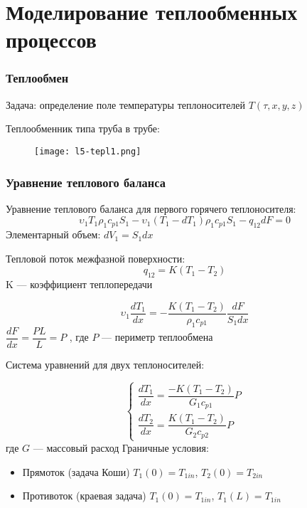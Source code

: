 \section{Моделирование теплообменных процессов}

\begin{frame}
	\frametitle{Теплообмен}
	Задача: определение поле температуры теплоносителей $T(\tau, x, y, z)$
	
	Теплообменник типа труба в трубе:
	\begin{figure}[h]
		\texttt{[image: l5-tepl1.png]}
	\end{figure}
\end{frame}

\begin{frame}
\frametitle{Уравнение теплового баланса}
Уравнение теплового баланса для первого горячего теплоносителя:
\begin{equation}
	\upsilon_1 T_1 \rho_1 c_{p1} S_1 - \upsilon_1 (T_1-dT_1) \rho_1 c_{p1} S_1 -q_{12} dF =0
\end{equation}
Элементарный объем: $dV_1=S_1 dx$

Тепловой поток межфазной поверхности:
\begin{equation}
	q_{12}=K ( T_1 - T_2 )
\end{equation}
K --- коэффициент теплопередачи

\begin{equation}
	\upsilon_1  \dfrac{ dT_1 }  { dx } = - \dfrac { K (T_1 -T_2)  }  { \rho_1 c_{p1} } \dfrac { d F } { S_1 dx }
\end{equation}
$ \dfrac {dF} { d x } = \dfrac { P L } {L} = P$
, где $P$ --- периметр теплообмена
\end{frame}

\begin{frame}
Система уравнений для двух теплоносителей:

\begin{equation}
\left\lbrace 
\begin{gathered} 
\dfrac {dT_1} {dx} = \dfrac {-K (T_1-T_2)} {G_1 c_{p1}} P \\
\dfrac {dT_2} {dx} = \dfrac {K (T_1-T_2)} {G_2 c_{p2}} P
\end{gathered} 
\right.
\end{equation}
где $G$ --- массовый расход
Граничные условия:
\begin{itemize}
\item Прямоток (задача Коши)
$T_1( 0 ) =T_{1 in}$,  $T_2( 0 ) =T_{2 in}$
\item Противоток (краевая задача)
$T_1( 0 ) =T_{1 in}$,  $T_1( L ) =T_{1 in}$

\end{itemize}
\end{frame}

